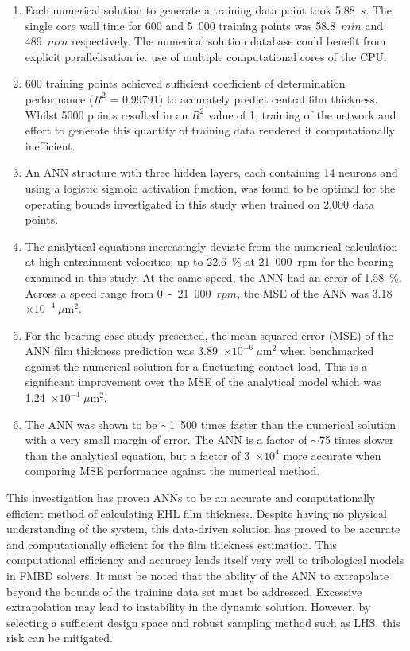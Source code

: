 \begin{enumerate}
	\item Each numerical solution to generate a training data point took 5.88~$s$. The single core wall time for 600 and 5~000 training points was 58.8~$min$ and 489~$min$ respectively. The numerical solution database could benefit from explicit parallelisation ie. use of multiple computational cores of the CPU. 
	\item 600 training points achieved sufficient coefficient of determination performance ($R^2$ = 0.99791) to accurately predict central film thickness. Whilst 5000 points resulted in an $R^2$ value of 1, training of the network and effort to generate this quantity of training data rendered it computationally inefficient.
	\item An ANN structure with three hidden layers, each containing 14 neurons and using a logistic sigmoid activation function, was found to be optimal for the operating bounds investigated in this study when trained on 2,000 data points.
	\item The analytical equations increasingly deviate from the numerical calculation at high entrainment velocities; up to 22.6~\% at 21~000~rpm for the bearing examined in this study. At the same speed, the ANN had an error of 1.58~\%. Across a speed range from 0~-~21~000~$rpm$, the MSE of the ANN was 3.18~$\times 10^{-4}~\mu \mathrm{m}^2$.
	\item For the bearing case study presented, the mean squared error (MSE) of the ANN film thickness prediction was 3.89~$\times 10^{-6}~\mu \mathrm{m}^2$ when benchmarked against the numerical solution for a fluctuating contact load. This is a significant improvement over the MSE of the analytical model which was 1.24~$\times 10^{-1}~\mu\mathrm{m}^2$.
	\item The ANN was shown to be $\sim$1~500 times faster than the numerical solution with a very small margin of error. The ANN is a factor of $\sim$75 times slower than the analytical equation, but a factor of 3~$\times 10^{4}$ more accurate when comparing MSE performance against the numerical method.
\end{enumerate}

This investigation has proven ANNs to be an accurate and computationally efficient method of calculating EHL film thickness. Despite having no physical understanding of the system, this data-driven solution has proved to be accurate and computationally efficient for the film thickness estimation. This computational efficiency and accuracy lends itself very well to tribological models in FMBD solvers. It must be noted that the ability of the ANN to extrapolate beyond the bounds of the training data set must be addressed. Excessive extrapolation may lead to instability in the dynamic solution. However, by selecting a sufficient design space and robust sampling method such as LHS, this risk can be mitigated.

